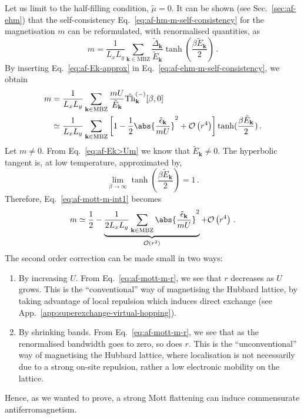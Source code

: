 Let us limit to the half-filling condition, $\tilde{\mu}=0$. It can be shown (see Sec.~\ref{sec:af-ehm}) that the self-consistency Eq.~\eqref{eq:af-hm-m-self-consistency} for the magnetisation $m$ can be reformulated, with renormalised quantities, as
\begin{equation}\label{eq:af-ehm-m-self-consistency}
	m = \frac{1}{L_x L_y} \sum_{\mathbf{k} \in \mathrm{MBZ}} \frac{\tilde{\Delta}_\mathbf{k}}{\tilde{E}_{\mathbf{k}}} \tanh(\frac{\beta \tilde{E}_\mathbf{k}}{2}) \, .
\end{equation}
By inserting Eq.~\eqref{eq:af-Ek-approx} in Eq.~\eqref{eq:af-ehm-m-self-consistency}, we obtain
\begin{align}
	m &= \frac{1}{L_x L_y} \sum_{\mathbf{k} \in \mathrm{MBZ}} \frac{mU}{\tilde{E}_\mathbf{k}} \tilde{\mathrm{Th}}_\mathbf{k}^{(-)}[\beta,0] \nonumber \\
	&\simeq \frac{1}{L_x L_y} \sum_{\mathbf{k} \in \mathrm{MBZ}} \left[
	1 - \frac{1}{2} \abs{\frac{\tilde{\epsilon}_\mathbf{k}}{mU}}^2 + \mathcal{O} \left(r^4\right)
	\right] \tanh(\frac{\beta \tilde{E}_\mathbf{k}}{2}) \label{eq:af-mott-m-int1} \, .
\end{align}
Let $m \neq 0$. From Eq.~\eqref{eq:af-Ek>Um} we know that $\tilde{E}_\mathbf{k} \neq 0$. The hyperbolic tangent is, at low temperature, approximated by,
\[
\lim_{\beta \to \infty} \tanh(\frac{\beta \tilde{E}_\mathbf{k}}{2}) = 1 \, .
\]
Therefore, Eq.~\eqref{eq:af-mott-m-int1} becomes
\begin{align}
	m \simeq \frac{1}{2} -
	\underbrace{
		\frac{1}{2L_x L_y} \sum_{\mathbf{k} \in \mathrm{MBZ}} \abs{\frac{\tilde{\epsilon}_\mathbf{k}}{mU}}^2 
	}_{\mathcal{O} \left(r^2\right)}
	+ \mathcal{O} \left(r^4\right) \, .
\end{align}
The second order correction can be made small in two ways:
\begin{enumerate}
	\item By increasing $U$. From Eq.~\eqref{eq:af-mott-m-r}, we see that $r$ decreases as $U$ grows. This is the ``conventional'' way of magnetising the Hubbard lattice, by taking advantage of local repulsion which induces direct exchange (see App.~\ref{app:superexchange-virtual-hopping}).
	\item By shrinking bands. From Eq.~\eqref{eq:af-mott-m-r}, we see that as the renormalised bandwidth goes to zero, so does $r$. This is the ``unconventional'' way of magnetising the Hubbard lattice, where localisation is not necessarily due to a strong on-site repulsion, rather a low electronic mobility on the lattice.
\end{enumerate}
Hence, as we wanted to prove, a strong Mott flattening can induce commensurate antiferromagnetism.

